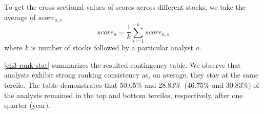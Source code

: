 \documentclass[a4paper,12pt,openright,notitlepage]{report}\usepackage[]{graphicx}\usepackage[]{color}
\begin{document}
To get the cross-sectional values of scores across different stocks, we take the average of $score_{a,s}$
\begin{equation}
\label{ch3-eq:mean-score}
\overline{score_{a}}= \frac{1}{k} \sum_{s=1}^{k} score_{a,s}
\end{equation}
where $k$ is number of stocks followed by a particular analyst $a$.

\ref{ch3-rank-stat} summarizes the resulted contingency table. We observe that analysts exhibit strong ranking consistency as, on average, they stay at the same tercile. The table demonstrates that 50.05\% and  28.83\%~(46.75\% and 30.83\%) of the analysts  remained in the top and bottom terciles, respectively, after one quarter (year).

\end{document}
